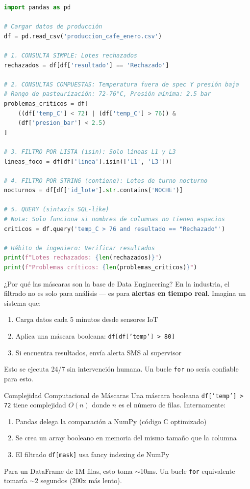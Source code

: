 \documentclass[11pt, a4paper]{article}
\begin{document}
\begin{lstlisting}[language=Python, caption={Filtrado avanzado para control de calidad}]
import pandas as pd

# Cargar datos de producción
df = pd.read_csv('produccion_cafe_enero.csv')

# 1. CONSULTA SIMPLE: Lotes rechazados
rechazados = df[df['resultado'] == 'Rechazado']

# 2. CONSULTAS COMPUESTAS: Temperatura fuera de spec Y presión baja
# Rango de pasteurización: 72-76°C, Presión mínima: 2.5 bar
problemas_criticos = df[
    ((df['temp_C'] < 72) | (df['temp_C'] > 76)) &
    (df['presion_bar'] < 2.5)
]

# 3. FILTRO POR LISTA (isin): Solo líneas L1 y L3
lineas_foco = df[df['linea'].isin(['L1', 'L3'])]

# 4. FILTRO POR STRING (contiene): Lotes de turno nocturno
nocturnos = df[df['id_lote'].str.contains('NOCHE')]

# 5. QUERY (sintaxis SQL-like)
# Nota: Solo funciona si nombres de columnas no tienen espacios
criticos = df.query('temp_C > 76 and resultado == "Rechazado"')

# Hábito de ingeniero: Verificar resultados
print(f"Lotes rechazados: {len(rechazados)}")
print(f"Problemas críticos: {len(problemas_criticos)}")
\end{lstlisting}

\begin{industrybox}{¿Por qué las máscaras son la base de Data Engineering?}
En la industria, el filtrado no es solo para análisis — es para \textbf{alertas en tiempo real}. Imagina un sistema que:
\begin{enumerate}
    \item Carga datos cada 5 minutos desde sensores IoT
    \item Aplica una máscara booleana: \texttt{df[df['temp'] > 80]}
    \item Si encuentra resultados, envía alerta SMS al supervisor
\end{enumerate}

Esto se ejecuta 24/7 sin intervención humana. Un bucle \texttt{for} no sería confiable para esto.
\end{industrybox}

\begin{sciencebox}{Complejidad Computacional de Máscaras}
Una máscara booleana \texttt{df['temp'] > 72} tiene complejidad \( O(n) \) donde \( n \) es el número de filas. Internamente:
\begin{enumerate}
    \item Pandas delega la comparación a NumPy (código C optimizado)
    \item Se crea un array booleano en memoria del mismo tamaño que la columna
    \item El filtrado \texttt{df[mask]} usa fancy indexing de NumPy
\end{enumerate}

Para un DataFrame de 1M filas, esto toma $\sim$10ms. Un bucle \texttt{for} equivalente tomaría $\sim$2 segundos (200x más lento).
\end{sciencebox}
\end{document}
